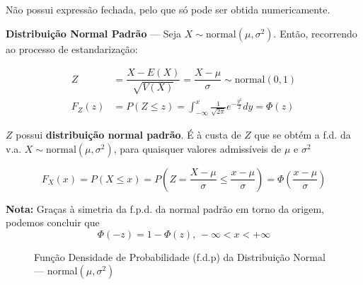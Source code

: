 \noindent Não possui expressão fechada, pelo que só pode ser obtida numericamente.

{

\begin{mdframed}
    \noindent \textbf{Distribuição Normal Padrão} --- Seja $X \sim \text{normal}(\mu,\sigma^2)$. Então, recorrendo ao processo de estandarização:
    
    \vspace{-0.5em}
    \begin{align*}
        Z &= \dfrac{X - E(X)}{\sqrt{V(X)}} = \dfrac{X - \mu}{\sigma} \sim \text{normal}(0,1)\\
        F_Z(z) &= P(Z \leq z) = \int_{-\infty}^x \frac{1}{\sqrt{2 \pi}}e^{-\frac{y^2}{2}}dy = \Phi(z)
    \end{align*}
    
    \noindent $Z$ possui \textbf{distribuição normal padrão}. É à custa de $Z$ que se obtém a f.d. da v.a. $X \sim \text{normal}(\mu,\sigma^2)$, para quaisquer valores admissíveis de $\mu$ e $\sigma^2$

    $$
        F_X(x) = P(X \leq x) = P\left(Z = \dfrac{X - \mu}{\sigma} \leq \dfrac{x - \mu}{\sigma}\right) = \Phi\left(\dfrac{x - \mu}{\sigma}\right)
    $$

    \noindent\textbf{Nota:} Graças à simetria da f.p.d. da normal padrão em torno da origem, podemos concluir que
    $$
        \Phi(-z) = 1 - \Phi(z),\, -\infty < x < +\infty
    $$
\end{mdframed}
}

\vspace{1.5em}
\begin{figure}[H]
    \centering
    \caption{Função Densidade de Probabilidade (f.d.p) da Distribuição Normal --- normal$(\mu,\sigma^2)$}
\end{figure}



